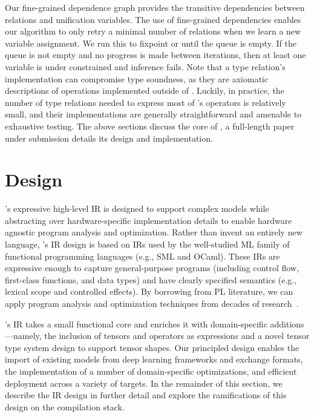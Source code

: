   Our fine-grained dependence graph provides the transitive dependencies
    between relations and unification variables.
  The use of fine-grained dependencies enables our algorithm to
    only retry a minimal number of relations when we
    learn a new variable assignment.
  We run this to fixpoint or until the queue is empty.
  If the queue is not empty and no progress is made between iterations,
    then at least one variable is under constrained and inference fails.
  Note that a type relation's implementation can
    compromise type soundness, as they are axiomatic descriptions
    of operations implemented outside of \relay.
  Luckily, in practice, the number of type relations needed to express most of \relay's
    operators is relatively small, and their implementations are generally straightforward
    and amenable to exhaustive testing.
The above sections discuss the core of \relay, a full-length paper under submission\citep{relay_arixv}
  details its design and implementation.

  \section{Design}
  \label{sec:design}

  \relay's expressive high-level IR is designed to support
    complex models while abstracting over hardware-specific
    implementation details to enable hardware agnostic program
    analysis and optimization.
  Rather than invent an entirely new language,
    \relay's IR design is based on IRs used by the well-studied ML family of
    functional programming languages (e.g., SML and OCaml).
  These IRs are expressive enough to capture general-purpose programs
    (including control flow, first-class functions, and data types)
    and have clearly specified semantics (e.g., lexical scope and controlled effects).
  By borrowing from PL literature,
    we can apply program analysis and optimization techniques from decades of research~\citep{haskell_vector}.

  \relay's IR takes a small functional core and enriches it with domain-specific additions---namely,
    the inclusion of tensors and operators as expressions
    and a novel tensor type system design to support tensor shapes.
  Our principled design
    enables the import of existing models from deep learning frameworks and exchange formats,
    the implementation of a number of domain-specific optimizations,
    and efficient deployment across a variety of targets.
  In the remainder of this section,
    we describe the IR design in further detail
    and explore the ramifications of this design on the compilation stack.

